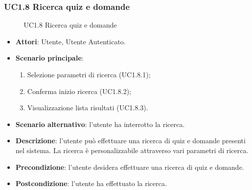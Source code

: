 \subsubsection{UC1.8 Ricerca quiz e domande}
\begin{figure}[H]
\centering
\noindent{}
\caption{UC1.8 Ricerca quiz e domande}
\end{figure}
\begin{itemize}
\item \textbf{Attori}: Utente, Utente Autenticato.
\item \textbf{Scenario principale}:
\begin{enumerate}
\item Selezione parametri di ricerca (UC1.8.1);
\item Conferma inizio ricerca (UC1.8.2);
\item Visualizzazione lista risultati (UC1.8.3).
\end{enumerate}
\item \textbf{Scenario alternativo}: l'utente ha interrotto la ricerca.
\item \textbf{Descrizione}: l'utente può effettuare una ricerca di quiz e domande presenti nel sistema. La ricerca è personalizzabile attraverso vari parametri di ricerca.
\item \textbf{Precondizione}: l'utente desidera effettuare una ricerca di quiz e domande.
\item \textbf{Postcondizione}: l'utente ha effettuato la ricerca.
\end{itemize}
